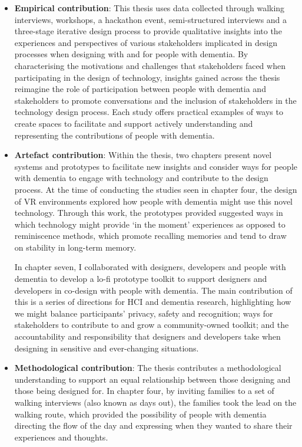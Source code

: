 \begin{itemize}
    \item \textbf{Empirical contribution}: This thesis uses data collected through walking interviews, workshops, a hackathon event, semi-structured interviews and a three-stage iterative design process to provide qualitative insights into the experiences and perspectives of various stakeholders implicated in design processes when designing with and for people with dementia. By characterising the motivations and challenges that stakeholders faced when participating in the design of technology, insights gained across the thesis reimagine the role of participation between people with dementia and stakeholders to promote conversations and the inclusion of stakeholders in the technology design process. Each study offers practical examples of ways to create spaces to facilitate and support actively understanding and representing the contributions of people with dementia.

    
    \item \textbf{Artefact contribution}: Within the thesis, two chapters present novel systems and prototypes to facilitate new insights and consider ways for people with dementia to engage with technology and contribute to the design process. At the time of conducting the studies seen in chapter four, the design of VR environments explored how people with dementia might use this novel technology. Through this work, the prototypes provided suggested ways in which technology might provide `in the moment' experiences as opposed to reminiscence methods, which promote recalling memories and tend to draw on stability in long-term memory.

    In chapter seven, I collaborated with designers, developers and people with dementia to develop a lo-fi prototype toolkit to support designers and developers in co-design with people with dementia. The main contribution of this is a series of directions for HCI and dementia research, highlighting how we might balance participants’ privacy, safety and recognition; ways for stakeholders to contribute to and grow a community-owned toolkit; and the accountability and responsibility that designers and developers take when designing in sensitive and ever-changing situations.

    
    \item \textbf{Methodological contribution}:  The thesis contributes a methodological understanding to support an equal relationship between those designing and those being designed for. In chapter four, by inviting families to a set of walking interviews (also known as days out), the families took the lead on the walking route, which provided the possibility of people with dementia directing the flow of the day and expressing when they wanted to share their experiences and thoughts.


\end{itemize}
